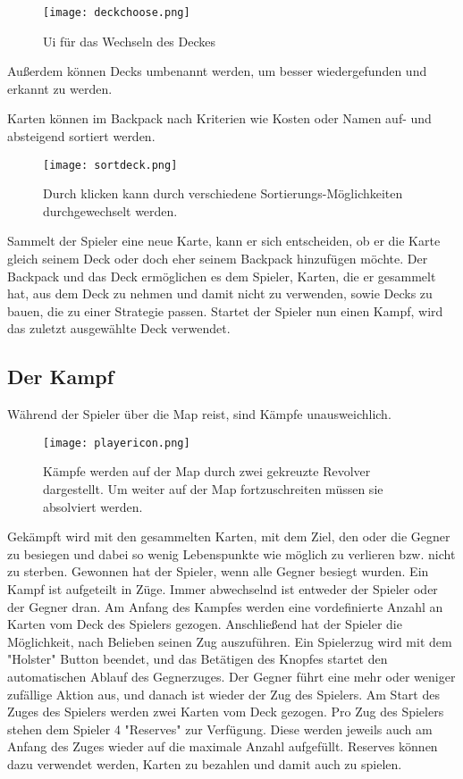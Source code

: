 \begin{figure}[H]
    \texttt{[image: deckchoose.png]}
    \caption{Ui für das Wechseln des Deckes}
\end{figure}


Außerdem können Decks umbenannt werden, um besser wiedergefunden und erkannt zu werden.

Karten können im Backpack nach Kriterien wie Kosten oder Namen auf- und absteigend sortiert werden.

\begin{figure}[H]
    \texttt{[image: sortdeck.png]}
    \caption{Durch klicken kann durch verschiedene Sortierungs-Möglichkeiten durchgewechselt werden.}
\end{figure}

Sammelt der Spieler eine neue Karte, kann er sich entscheiden, ob er die Karte gleich seinem Deck oder doch eher seinem
Backpack hinzufügen möchte.
Der Backpack und das Deck ermöglichen es dem Spieler, Karten, die er gesammelt hat, aus dem Deck zu nehmen und damit
nicht zu verwenden, sowie Decks zu bauen, die zu einer Strategie passen.
Startet der Spieler nun einen Kampf, wird das zuletzt ausgewählte Deck verwendet.


\subsection{Der Kampf}\label{backpack_and_deck}

Während der Spieler über die Map reist, sind Kämpfe unausweichlich.

\begin{figure}[H]
    \texttt{[image: playericon.png]}
    \caption{Kämpfe werden auf der Map durch zwei gekreuzte Revolver dargestellt. Um weiter auf der Map fortzuschreiten müssen sie absolviert werden.}
\end{figure}

Gekämpft wird mit den gesammelten Karten, mit dem Ziel, den oder die Gegner zu besiegen und dabei so wenig Lebenspunkte
wie möglich zu verlieren bzw. nicht zu sterben. Gewonnen hat der Spieler, wenn alle Gegner besiegt wurden.
Ein Kampf ist aufgeteilt in Züge. Immer abwechselnd ist entweder der Spieler oder der Gegner dran. Am Anfang des Kampfes
werden eine vordefinierte Anzahl an Karten vom Deck des Spielers gezogen.
Anschließend hat der Spieler die Möglichkeit, nach Belieben seinen Zug auszuführen. Ein Spielerzug wird mit dem "Holster"
Button beendet, und das Betätigen des Knopfes startet den automatischen Ablauf des Gegnerzuges. Der Gegner führt eine mehr oder weniger zufällige Aktion aus, und danach ist wieder der Zug des Spielers.
Am Start des Zuges des Spielers werden zwei Karten vom Deck gezogen. Pro Zug des Spielers stehen dem Spieler 4 "Reserves"
zur Verfügung. Diese werden jeweils auch am Anfang des Zuges wieder auf die maximale Anzahl aufgefüllt.
Reserves können dazu verwendet werden, Karten zu bezahlen und damit auch zu spielen.


